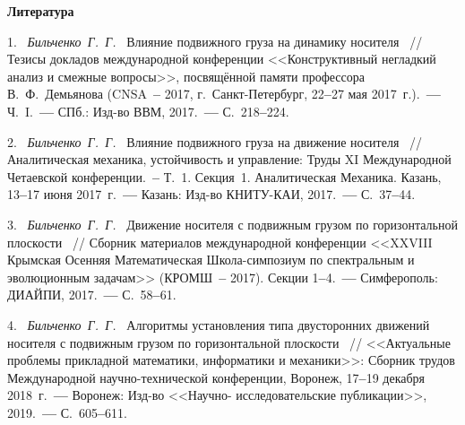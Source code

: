 \smallskip \centerline {\bf Литература} \nopagebreak



1.~%
\textit%
{Бильченко~Г.~Г.~}
{%
  {Влияние подвижного груза
 на динамику носителя}%
~/$\!$/
  Тезисы докладов международной конференции
  <<Конструктивный негладкий анализ
  и смежные вопросы>>,
  посвящённой памяти профессора
  В.~Ф.~Демьянова
  (CNSA~{\textbf{--}} 2017,
  г.~Санкт-Петербург,
  22{\textbf{--}}27
  мая 2017~г.).~{\textbf{---}}
  Ч.~I.~{\textbf{---}}
  СПб.: Изд-во ВВМ,
  2017.~{\textbf{---}}
  С.~218{\textbf{--}}224.%
  }



2.~%
\textit%
{Бильченко~Г.~Г.~}
{%
  {Влияние подвижного груза
  на движение носителя}%
~/$\!$/
  Аналитическая механика,
  устойчивость и управление:
  Труды XI Международной
  Четаевской конференции.~{\textbf{--}}
  Т.~1.
  Секция~1.
  Аналитическая Механика.
  Казань,
  13{\textbf{--}}17
  июня 2017~г.~{\textbf{---}}
  Казань: Изд-во КНИТУ-КАИ,
  2017.~{\textbf{---}}
  С.~37{\textbf{--}}44.%
  }



3.~%
\textit%
{Бильченко~Г.~Г.~}
{%
  {Движение носителя с подвижным грузом
  по горизонтальной плоскости}%
~/$\!$/
  Сборник материалов международной конференции
  <<XXVIII Крымская Осенняя
  Математическая Школа-симпозиум
  по спектральным и эволюционным задачам>>
  (КРОМШ~{\textbf{--}} 2017).
  Секции
  1{\textbf{--}}4.~{\textbf{---}}
  Симферополь: ДИАЙПИ,
  2017.~{\textbf{---}}
  С.~58{\textbf{--}}61.%
  }



4.~%
\textit%
{Бильченко~Г.~Г.~}
{%
  {Алгоритмы
  установления типа
  двусторонних движений носителя
  с подвижным грузом
  по горизонтальной плоскости}%
~/$\!$/
  <<Актуальные проблемы
  прикладной математики, информатики
  и механики>>:
  Сборник трудов Международной
  научно-технической конференции,
  Воронеж,
  17{\textbf{--}}19
  декабря 2018~г.~{\textbf{---}}
  Воронеж:
  Изд-во
  <<Научно-%
  ис\-сле\-до\-ва\-тель\-ские
  публикации>>,
  2019.~{\textbf{---}}
  С.~605{\textbf{--}}611.%
 }



